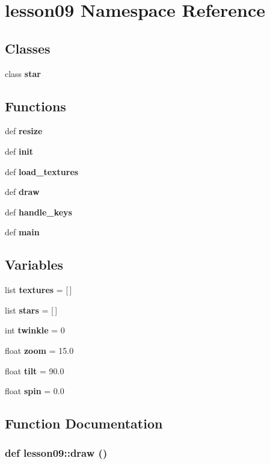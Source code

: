 \section{lesson09 Namespace Reference}
\label{namespacelesson09}


\subsection*{Classes}
\begin{CompactItemize}
\item 
class {\bf star}
\end{CompactItemize}
\subsection*{Functions}
\begin{CompactItemize}
\item 
def {\bf resize}
\item 
def {\bf init}
\item 
def {\bf load\_\-textures}
\item 
def {\bf draw}
\item 
def {\bf handle\_\-keys}
\item 
def {\bf main}
\end{CompactItemize}
\subsection*{Variables}
\begin{CompactItemize}
\item 
list {\bf textures} = [$\,$]
\item 
list {\bf stars} = [$\,$]
\item 
int {\bf twinkle} = 0
\item 
float {\bf zoom} = 15.0
\item 
float {\bf tilt} = 90.0
\item 
float {\bf spin} = 0.0
\end{CompactItemize}


\subsection{Function Documentation}
\subsubsection{\setlength{\rightskip}{0pt plus 5cm}def lesson09::draw ()}\label{namespacelesson09_2bf07b01210893c83bb2f54f9d18e3bd}




